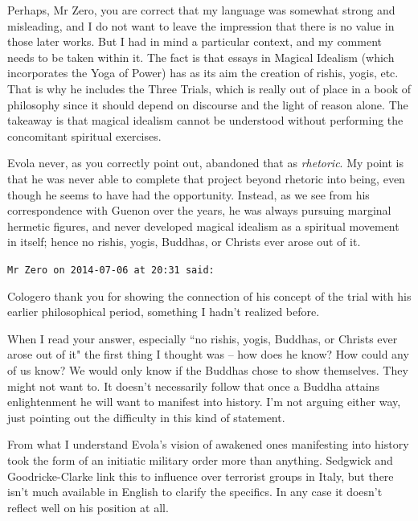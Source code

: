 \begin{footnotesize}
\begin{sffamily}
Perhaps, Mr Zero, you are correct that my language was somewhat strong and misleading, and I do not want to leave the impression that there is no value in those later works. But I had in mind a particular context, and my comment needs to be taken within it. The fact is that essays in Magical Idealism (which incorporates the Yoga of Power) has as its aim the creation of rishis, yogis, etc. That is why he includes the Three Trials, which is really out of place in a book of philosophy since it should depend on discourse and the light of reason alone. The takeaway is that magical idealism cannot be understood without performing the concomitant spiritual exercises.

Evola never, as you correctly point out, abandoned that as \emph{rhetoric}. My point is that he was never able to complete that project beyond rhetoric into being, even though he seems to have had the opportunity. Instead, as we see from his correspondence with Guenon over the years, he was always pursuing marginal hermetic figures, and never developed magical idealism as a spiritual movement in itself; hence no rishis, yogis, Buddhas, or Christs ever arose out of it.


\hfill

\texttt{Mr Zero on 2014-07-06 at 20:31 said: }

Cologero thank you for showing the connection of his concept of the trial with his earlier philosophical period, something I hadn't realized before.

When I read your answer, especially ``no rishis, yogis, Buddhas, or Christs ever arose out of it" the first thing I thought was – how does he know? How could any of us know? We would only know if the Buddhas chose to show themselves. They might not want to. It doesn't necessarily follow that once a Buddha attains enlightenment he will want to manifest into history. I'm not arguing either way, just pointing out the difficulty in this kind of statement.

From what I understand Evola's vision of awakened ones manifesting into history took the form of an initiatic military order more than anything. Sedgwick and Goodricke-Clarke link this to influence over terrorist groups in Italy, but there isn't much available in English to clarify the specifics. In any case it doesn't reflect well on his position at all.


\hfill


\end{sffamily}\end{footnotesize}